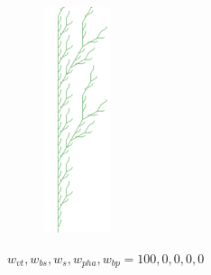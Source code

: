 \begin{figure}[H]
\begin{subfigure}[b]{0.05\textwidth}
        \includegraphics[width=\textwidth]{vt_only_dr.png}
    \end{subfigure}
    \vspace{0.5cm}
    \caption{$w_{vt}, w_{bs}, w_{s}, w_{pha}, w_{bp} = 100, 0, 0, 0, 0$}
    \label{fig:subfigures}
\end{figure}

